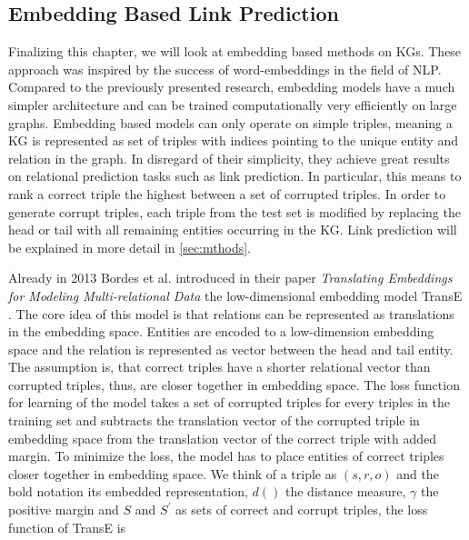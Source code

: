 

\subsection{Embedding Based Link Prediction}
\label{ssec:embedlp}
Finalizing this chapter, we will look at embedding based methods on KGs. These approach was inspired by the success of word-embeddings in the field of NLP. Compared to the previously presented research, embedding models have a much simpler architecture and can be trained computationally very efficiently on large graphs. Embedding based models can only operate on simple triples, meaning a KG is represented as set of triples with indices pointing to the unique entity and relation in the graph. In disregard of their simplicity, they achieve great results on relational prediction tasks such as link prediction. In particular, this means to rank a correct triple the highest between a set of corrupted triples. In order to generate corrupt triples, each triple from the test set is modified by replacing the head or tail with all remaining entities occurring in the KG. Link prediction will be explained in more detail in \ref{sec:mthods}. 


Already in 2013 Bordes et al. introduced in their paper \textit{Translating Embeddings for Modeling Multi-relational Data} the low-dimensional embedding model TransE \cite{bordes_translating_2013}. The core idea of this model is that relations can be represented as translations in the embedding space. Entities are encoded to a low-dimension embedding space and the relation is represented as vector between the head and tail entity. The assumption is, that correct triples have a shorter relational vector than corrupted triples, thus, are closer together in embedding space. The loss function for learning of the model takes a set of corrupted triples for every triples in the training set and subtracts the translation vector of the corrupted triple in embedding space from the translation vector of the correct triple with added margin. To minimize the loss, the model has to place entities of correct triples closer together in embedding space. We think of a triple as $(s,r,o)$ and the bold notation its embedded representation, $d()$ the distance measure, $\gamma$ the positive margin and $S$ and $S^{\prime}$ as sets of correct and corrupt triples, the loss function of TransE is 

